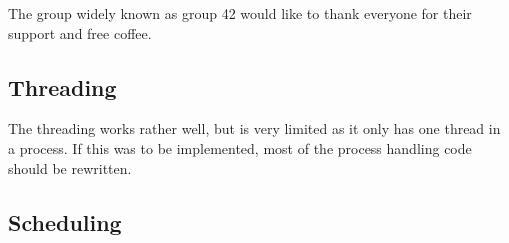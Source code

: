 The group widely known as group 42 would like to thank everyone for their support and free coffee.\\

\subsection{Threading}
The threading works rather well, but is very limited as it only has one thread in a process. If this was to be implemented, most of the
process handling code should be rewritten.

\subsection{Scheduling}
